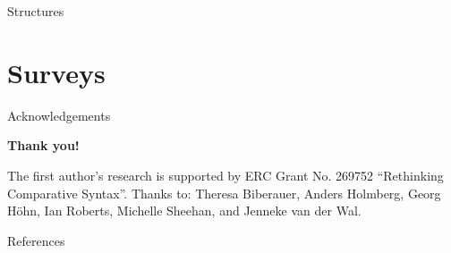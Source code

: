 \documentclass[12pt]{beamer}
\begin{document}
\begin{frame}{Structures}

\ex
\xe

\end{frame}

\section{Surveys}

\begin{frame}{Acknowledgements}

\begin{center}
    \Large \textbf{Thank you!}
\end{center}

The first author's research is supported by ERC Grant No. 269752
\enquote{Rethinking Comparative Syntax}. Thanks to: Theresa Biberauer, Anders
Holmberg, Georg Höhn, Ian Roberts, Michelle Sheehan, and Jenneke van der Wal.

\end{frame}

\begin{frame}[allowframebreaks]{References}

\small
\setlength{\parindent}{-0.2in} \setlength{\leftskip}{0.2in}
\setlength{\parskip}{3pt}
\newrefcontext[sorting=nyt]
\printbibliography
\end{frame}
\end{document}
